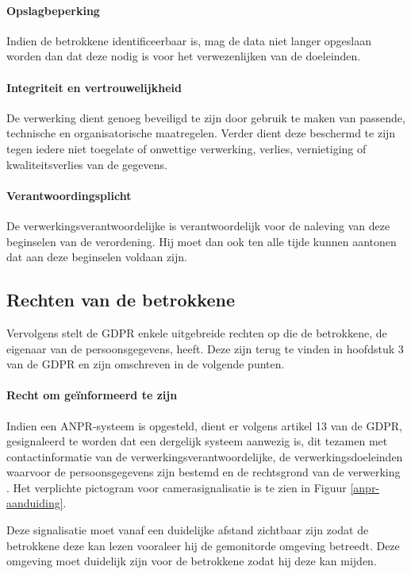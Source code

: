 \paragraph{Opslagbeperking}
Indien de betrokkene identificeerbaar is, mag de data niet langer opgeslaan worden dan dat deze nodig is voor het verwezenlijken van de doeleinden.

\paragraph{Integriteit en vertrouwelijkheid}
De verwerking dient genoeg beveiligd te zijn door gebruik te maken van passende, technische en organisatorische maatregelen. Verder dient deze beschermd te zijn tegen iedere niet toegelate of onwettige verwerking, verlies, vernietiging of kwaliteitsverlies van de gegevens.

\paragraph{Verantwoordingsplicht}
De verwerkingsverantwoordelijke is verantwoordelijk voor de naleving van deze beginselen van de verordening. Hij moet dan ook ten alle tijde kunnen aantonen dat aan deze beginselen voldaan zijn.


\subsection{Rechten van de betrokkene}
\label{rechten-betrokkene}
Vervolgens stelt de GDPR enkele uitgebreide rechten op die de betrokkene, de eigenaar van de persoonsgegevens, heeft. Deze zijn terug te vinden in hoofdstuk 3 van de GDPR en zijn omschreven in de volgende punten.

\paragraph{Recht om geïnformeerd te zijn}
Indien een ANPR-systeem is opgesteld, dient er volgens artikel 13 van de GDPR, gesignaleerd te worden dat een dergelijk systeem aanwezig is, dit tezamen met contactinformatie van de verwerkingsverantwoordelijke, de verwerkingsdoeleinden waarvoor de persoonsgegevens zijn bestemd en de rechtsgrond van de verwerking \autocite{besafe2018picto}. Het verplichte pictogram voor camerasignalisatie is te zien in Figuur \ref{anpr-aanduiding}.

Deze signalisatie moet vanaf een duidelijke afstand zichtbaar zijn zodat de betrokkene deze kan lezen vooraleer hij de gemonitorde omgeving betreedt. Deze omgeving moet duidelijk zijn voor de betrokkene zodat hij deze kan mijden.

